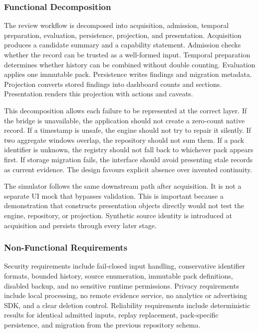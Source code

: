 \subsubsection{Functional Decomposition}

The review workflow is decomposed into acquisition, admission, temporal preparation, evaluation, persistence, projection, and presentation. Acquisition produces a candidate summary and a capability statement. Admission checks whether the record can be trusted as a well-formed input. Temporal preparation determines whether history can be combined without double counting. Evaluation applies one immutable pack. Persistence writes findings and migration metadata. Projection converts stored findings into dashboard counts and sections. Presentation renders this projection with actions and caveats.

This decomposition allows each failure to be represented at the correct layer. If the bridge is unavailable, the application should not create a zero-count native record. If a timestamp is unsafe, the engine should not try to repair it silently. If two aggregate windows overlap, the repository should not sum them. If a pack identifier is unknown, the registry should not fall back to whichever pack appears first. If storage migration fails, the interface should avoid presenting stale records as current evidence. The design favours explicit absence over invented continuity.

The simulator follows the same downstream path after acquisition. It is not a separate UI mock that bypasses validation. This is important because a demonstration that constructs presentation objects directly would not test the engine, repository, or projection. Synthetic source identity is introduced at acquisition and persists through every later stage.

\subsubsection{Non-Functional Requirements}

Security requirements include fail-closed input handling, conservative identifier formats, bounded history, source enumeration, immutable pack definitions, disabled backup, and no sensitive runtime permissions. Privacy requirements include local processing, no remote evidence service, no analytics or advertising SDK, and a clear deletion control. Reliability requirements include deterministic results for identical admitted inputs, replay replacement, pack-specific persistence, and migration from the previous repository schema.

